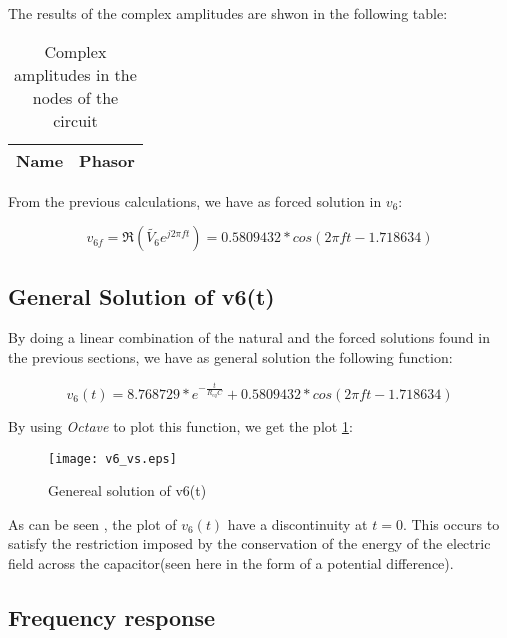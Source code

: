 \hfill


The results of the complex amplitudes are shwon in the following table:

\begin{table}[b]
  \centering
  \begin{tabular}{|l|c|}
    \hline
    {\bf Name} & {\bf Phasor} \\ \hline
    
  \end{tabular}
  \caption{Complex amplitudes in the nodes of the circuit}
  \label{tab:op_tabNodal}
\end{table}


From the previous calculations, we have as forced solution in $v_6$:

\begin{equation}
  v_{6f} = \Re (\tilde{V_6} e^{j 2\pi f t}) = 0.5809432*cos(2 \pi f t - 1.718634)
  \label{forcedSolution}
\end{equation}


\subsection{General Solution of v6(t)}

By doing a linear combination of the natural and the forced solutions found in the previous sections, we have as general solution the following function:

\begin{equation}
  v_6(t) = 8.768729*e^{-\frac{t}{R_{eq}C}} + 0.5809432*cos(2 \pi f t - 1.718634)
  \label{finalSolution}
\end{equation}

By using \textit{Octave} to plot this function, we get the plot \ref{fig:generalFinal}:

\begin{figure}[h] \centering
  \texttt{[image: v6\_vs.eps]}
  \caption{Genereal solution of v6(t)}
  \label{fig:generalFinal}
\end{figure}


As can be seen , the plot of $v_6(t)$ have a discontinuity at $t = 0$.
This occurs to satisfy the restriction imposed by the conservation of the energy  of the electric field across the capacitor(seen here in the form of a potential difference).


\subsection{Frequency response}

